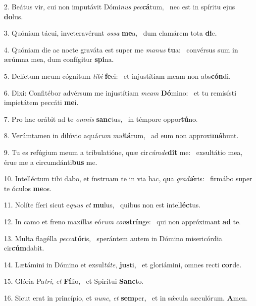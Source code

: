 2. Beátus vir, cui non imputávit Dómi\textit{nus} \textit{pec}\textbf{cá}tum, \ast\  nec est in spíritu ejus \textbf{do}lus.\

3. Quóniam tácui, inveteravérunt \textit{os}\textit{sa} \textbf{me}a, \ast\  dum clamárem tota \textbf{di}e.\

4. Quóniam die ac nocte graváta est super me \textit{ma}\textit{nus} \textbf{tu}a: \ast\  convérsus sum in ærúmna mea, dum confígitur \textbf{spi}na.\

5. Delíctum meum cógnitum \textit{ti}\textit{bi} \textbf{fe}ci: \ast\  et injustítiam meam non abs\textbf{cón}di.\

6. Dixi: Confitébor advérsum me injustítiam \textit{me}\textit{am} \textbf{Dó}mino: \ast\  et tu remisísti impietátem peccáti \textbf{me}i.\

7. Pro hac orábit ad te \textit{om}\textit{nis} \textbf{sanc}tus, \ast\  in témpore oppor\textbf{tú}no.\

8. Verúmtamen in dilúvio aquá\textit{rum} \textit{mul}\textbf{tá}rum, \ast\  ad eum non approxi\textbf{má}bunt.\

9. Tu es refúgium meum a tribulatióne, quæ cir\textit{cúm}\textit{de}\textbf{dit} me: \ast\  exsultátio mea, érue me a circumdánti\textbf{bus} me.\

10. Intelléctum tibi dabo, et ínstruam te in via hac, qua \textit{gra}\textit{di}\textbf{é}ris: \ast\  firmábo super te óculos \textbf{me}os.\

11. Nolíte fíeri sicut e\textit{quus} \textit{et} \textbf{mu}lus, \ast\  quibus non est intel\textbf{léc}tus.\

12. In camo et freno maxíllas eó\textit{rum} \textit{con}\textbf{strín}ge: \ast\  qui non appróximant \textbf{ad} te.\

13. Multa flagélla \textit{pec}\textit{ca}\textbf{tó}ris, \ast\  sperántem autem in Dómino misericórdia cir\textbf{cúm}dabit.\

14. Lætámini in Dómino et exsul\textit{tá}\textit{te}, \textbf{jus}ti, \ast\  et gloriámini, omnes recti \textbf{cor}de.\

15. Glória Pa\textit{tri}, \textit{et} \textbf{Fí}lio, \ast\  et Spirítui \textbf{Sanc}to.\

16. Sicut erat in princípio, et \textit{nunc}, \textit{et} \textbf{sem}per, \ast\  et in sǽcula sæculórum. \textbf{A}men.\

